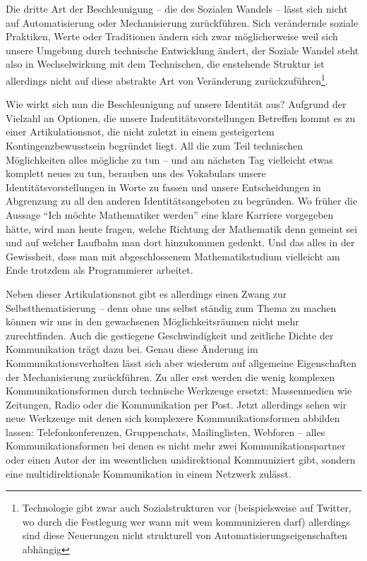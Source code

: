 Die dritte Art der Beschleunigung – die des Sozialen Wandels – lässt sich nicht auf Automatisierung oder Mechanisierung zurückführen.
Sich verändernde soziale Praktiken, Werte oder Traditionen ändern sich zwar möglicherweise weil sich unsere Umgebung durch technische Entwicklung ändert,
der Soziale Wandel steht also in Wechselwirkung mit dem Technischen\parencite{rosa1}, die enstehende Struktur ist allerdings nicht auf diese abstrakte Art von Veränderung zurückzuführen\footnote{Technologie gibt zwar auch Sozialstrukturen vor (beispielsweise auf Twitter, wo durch die Festlegung wer wann mit wem kommunizieren darf) allerdings sind diese Neuerungen nicht strukturell von Automatisierungseigenschaften abhängig}.

Wie wirkt sich nun die Beschleunigung auf unsere Identität aus? Aufgrund der Vielzahl an Optionen, die unsere Indentitätsvorstellungen Betreffen kommt es zu einer Artikulationsnot, die nicht zuletzt in einem gesteigertem Kontingenzbewusstsein begründet liegt.
All die zum Teil technischen Möglichkeiten alles mögliche zu tun – und am nächsten Tag vielleicht etwas komplett neues zu tun, berauben uns des Vokabulars unsere Identitätsvorstellungen in Worte zu fassen und unsere Entscheidungen in Abgrenzung zu all den anderen Identitätsangeboten zu begründen.
Wo früher die Aussage \enquote{Ich möchte Mathematiker werden} eine klare Karriere vorgegeben hätte, wird man heute fragen, welche Richtung der Mathematik denn gemeint sei und auf welcher Laufbahn man dort hinzukommen gedenkt.
Und das alles in der Gewissheit, dass man mit abgeschlossenem Mathematikstudium vielleicht am Ende trotzdem als Programmierer arbeitet.

Neben dieser Artikulationsnot gibt es allerdings einen Zwang zur Selbstthematisierung – denn ohne uns selbst ständig zum Thema zu machen können wir uns in den gewachsenen Möglichkeitsräumen nicht mehr zurechtfinden.
Auch die gestiegene Geschwindigkeit und zeitliche Dichte der Kommunikation trägt dazu bei.
Genau diese Änderung im Kommunikationsverhalten lässt sich aber wiederum auf allgemeine Eigenschaften der Mechanisierung zurückführen.
Zu aller erst werden die wenig komplexen Kommunikationsformen durch technische Werkzeuge ersetzt: Massenmedien wie Zeitungen, Radio oder die Kommunikation per Post. Jetzt allerdings sehen wir neue Werkzeuge mit denen sich komplexere Kommunikationsformen abbilden lassen: Telefonkonferenzen, Gruppenchats, Mailinglisten, Webforen – alles Kommunikationsformen bei denen es nicht mehr zwei Kommunikationspartner oder einen Autor der im wesentlichen unidirektional Kommuniziert gibt, sondern eine multidirektionale Kommunikation in einem Netzwerk zulässt.

